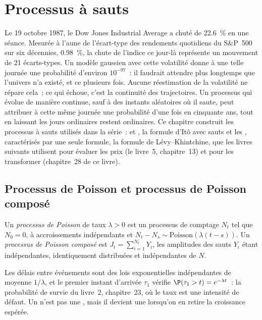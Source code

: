 \chapter{Processus à sauts}\label{ch:qm:jump-processes}

Le 19 octobre 1987, le Dow Jones Industrial Average a chuté de 22.6~\% en une séance. Mesurée à
l'aune de l'écart-type des rendements quotidiens du S\&P~500 sur six décennies, 0.98~\%, la chute de l'indice
ce jour-là représente un mouvement de 21 écarts-types. Un modèle gaussien avec cette volatilité donne à une telle
journée une probabilité d'environ $10^{-97}$~: il faudrait attendre plus longtemps que l'univers n'a
existé, et ce plusieurs fois. Aucune réestimation de la volatilité ne répare cela~; ce qui échoue, c'est
la continuité des trajectoires. Un processus qui évolue de manière continue, sauf à des instants aléatoires où il
saute, peut attribuer à cette même journée une probabilité d'une fois en cinquante ans, tout en laissant
les jours ordinaires restent ordinaires. Ce chapitre construit les processus à sauts utilisés dans la série~:  et
, la formule d'Itô avec sauts et les , caractérisés par
une seule formule, la formule de Lévy--Khintchine, que les livres suivants utilisent pour évaluer les prix (le livre~5,
chapitre~13) et pour les transformer (chapitre~28 de ce livre).

\section{Processus de Poisson et processus de Poisson composé}

\begin{definition}\label{def:qm:jump-processes:poisson}
Un \emph{processus de Poisson} de taux $\lambda > 0$ est un processus de comptage $N_t$ tel que $N_0 =
0$, à accroissements indépendants et $N_t - N_s \sim \mathrm{Poisson}(\lambda(t - s))$. Un \emph{processus de Poisson
composé} est $J_t = \sum_{i=1}^{N_t}Y_i$, les amplitudes des sauts $Y_i$ étant
indépendantes, identiquement distribuées et indépendantes de $N$.
\end{definition}

Les délais entre événements sont des lois exponentielles indépendantes de moyenne $1/\lambda$, et le premier
instant d'arrivée $\tau_1$ vérifie $\P(\tau_1 > t) = e^{-\lambda t}$~: la probabilité de survie du livre~2,
chapitre~23, où le taux est une intensité de défaut. Un  n'est pas une , mais il
devient une  lorsqu'on en retire la croissance espérée.

